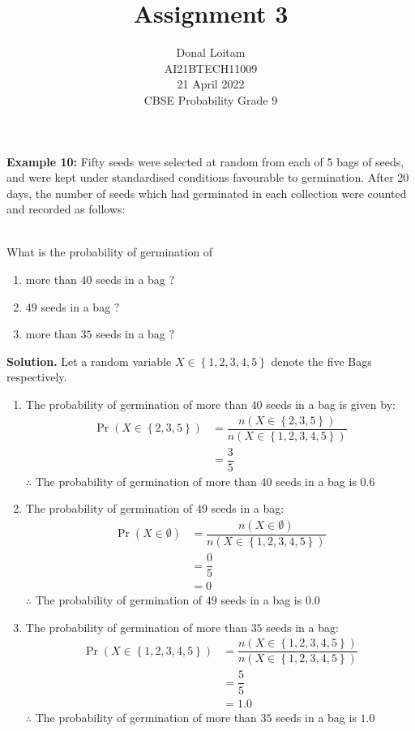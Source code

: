 \documentclass[journal,12pt,twocolumn]{IEEEtran}
\title{Assignment 3}
\author{Donal Loitam \\ \normalsize AI21BTECH11009 \\ \vspace*{20pt} \normalsize  21 April 2022 \\ \vspace*{20pt} \Large CBSE Probability Grade 9}
\providecommand{\cbrak}[1]{\ensuremath{\left\{#1\right\}}}
\providecommand{\pr}[1]{\ensuremath{\Pr\left(#1\right)}}
\begin{document}
	\maketitle
	
	\textbf{Example 10:}
	 Fifty seeds were selected at random from each of 5 bags of seeds, and
were kept under standardised conditions favourable to germination. After 20 days, the number of seeds which had germinated in each collection were counted and recorded as follows:\\
\begin{table}[ht!]
\begin{center}
		
		\vspace*{5pt}
		\caption{}
		\label{table:table1}
\end{center}	
	\end{table}\\
What is the probability of germination of
\begin{enumerate}[label=(\roman*)]
    \item more than $40$ seeds in a bag $?$
 	\item $49$ seeds in a bag $?$
 	\item more than $35$ seeds in a bag $?$
    \end{enumerate}
    
	\textbf{Solution.}
     Let a random variable $X \in \cbrak{1,2,3,4,5}$ denote the five Bags respectively. 
	\begin{enumerate}[label=(\roman*)]
    \item The probability of germination of more than $40$ seeds in a bag is given by:
	\begin{align}
	\pr{X \in \cbrak{2,3,5}} &= \dfrac{n(X \in \cbrak{2,3,5})}{n(X \in \cbrak{1,2,3,4,5})} \\
	&= \dfrac{3}{5}
	\end{align}
	$\therefore$ The probability of germination of more than $40$ seeds in a bag is $0.6$
	
	\item The probability of germination of $49$ seeds in a bag:
	\begin{align}
	\pr{X \in \emptyset} &= \dfrac{n(X \in \emptyset)}{n(X \in \cbrak{1,2,3,4,5})} \\
	&= \dfrac{0}{5}\\
	&= 0
	\end{align}
	$\therefore$ The probability of germination of $49$ seeds in a bag is $0.0$
	
	\item The probability of germination of more than $35$ seeds in a bag:
	\begin{align}
     \pr{X \in \cbrak{1,2,3,4,5}} &= \dfrac{n(X \in \cbrak{1,2,3,4,5})}{n(X \in \cbrak{1,2,3,4,5})} \\
	&= \dfrac{5}{5}\\
	&= 1.0
	\end{align}
	$\therefore$ The probability of germination of more than $35$ seeds in a bag is $1.0$
	
	\end{enumerate}
	
\end{document}
